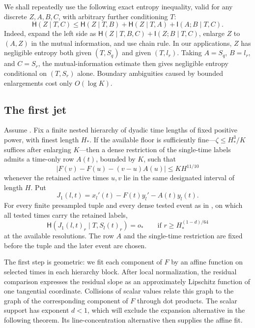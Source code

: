 We shall repeatedly use the following exact entropy inequality, valid
for any discrete \(Z,A,B,C\), with arbitrary further conditioning \(T\):
\begin{equation}\label{a04:common-information}
 \mathsf H(Z\mid T,C)
 \le \mathsf H(Z\mid T,B)+\mathsf H(Z\mid T,A)
          +\mathsf I(A;B\mid T,C).
\end{equation}
Indeed, expand the left side as
\(\mathsf H(Z\mid T,B,C)+\mathsf I(Z;B\mid T,C)\), enlarge \(Z\) to
\((A,Z)\) in the mutual information, and use chain rule.
In our applications, \(Z\) has negligible entropy both given
\((T,S_q)\) and given \((T,l_r)\).  Taking \(A=S_q\), \(B=l_r\),
and \(C=S_r\), the mutual-information estimate
 then gives negligible entropy
conditional on \((T,S_r)\) alone.  Boundary ambiguities caused by
bounded enlargements cost only \(O(\log K)\).

\subsection{The first jet}

\begin{proposition}\label{prop:scalar-normal}
Assume .  Fix a finite nested hierarchy of dyadic
time lengths of fixed positive power, with finest length \(H_*\).
If the available floor is sufficiently fine---\(\zeta\le H_*^3/K\)
suffices after enlarging \(K\)---then a dense restriction of the
single-time labels admits a time-only row \(A(t)\), bounded by \(K\),
such that
\begin{equation}\label{a04:first-taylor}
 |F(v)-F(u)-(v-u)A(u)|\le K H^{11/10}
\end{equation}
whenever the retained active times \(u,v\) lie in the same designated
interval of length \(H\).  Put
\[
 J_1(l,t)=x_l'(t)-F(t)y_l'-A(t)y_l(t).
\]
For every finite presampled tuple and every dense tested event as in
, on which all tested times carry the retained
labels,
\begin{equation}\label{a04:first-jet-entropy}
 \mathsf H(J_1(l,t)_r\mid T,S_l(t)_r)=o_*
 \qquad\text{if }r\ge H_*^{(1-d)/64}
\end{equation}
at the available resolutions.  The row \(A\) and the single-time
restriction are fixed before the tuple and the later event are chosen.
\end{proposition}

The first step is geometric: we fit each component of \(F\) by an
affine function on selected times in each hierarchy block.  After local
normalization, the residual comparison expresses the residual slope as an
approximately Lipschitz function of one tangential coordinate.
Collisions of scalar values relate this graph to the graph of the
corresponding component of \(F\) through dot products.  The scalar
support has exponent \(d<1\), which will exclude the expansion
alternative in the following theorem.  Its line-concentration
alternative then supplies the affine fit.

